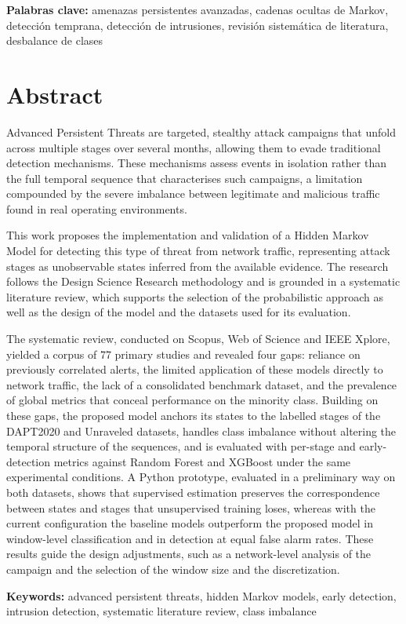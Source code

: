 {\bf Palabras clave:} amenazas persistentes avanzadas, cadenas ocultas de Markov, detección temprana, detección de intrusiones, revisión sistemática de literatura, desbalance de clases


\clearpage
\chapter*{Abstract}
Advanced Persistent Threats are targeted, stealthy attack campaigns that unfold across multiple stages over several months, allowing them to evade traditional detection mechanisms. These mechanisms assess events in isolation rather than the full temporal sequence that characterises such campaigns, a limitation compounded by the severe imbalance between legitimate and malicious traffic found in real operating environments.

This work proposes the implementation and validation of a Hidden Markov Model for detecting this type of threat from network traffic, representing attack stages as unobservable states inferred from the available evidence. The research follows the Design Science Research methodology and is grounded in a systematic literature review, which supports the selection of the probabilistic approach as well as the design of the model and the datasets used for its evaluation.

The systematic review, conducted on Scopus, Web of Science and IEEE Xplore, yielded a corpus of 77 primary studies and revealed four gaps: reliance on previously correlated alerts, the limited application of these models directly to network traffic, the lack of a consolidated benchmark dataset, and the prevalence of global metrics that conceal performance on the minority class. Building on these gaps, the proposed model anchors its states to the labelled stages of the DAPT2020 and Unraveled datasets, handles class imbalance without altering the temporal structure of the sequences, and is evaluated with per-stage and early-detection metrics against Random Forest and XGBoost under the same experimental conditions. A Python prototype, evaluated in a preliminary way on both datasets, shows that supervised estimation preserves the correspondence between states and stages that unsupervised training loses, whereas with the current configuration the baseline models outperform the proposed model in window-level classification and in detection at equal false alarm rates. These results guide the design adjustments, such as a network-level analysis of the campaign and the selection of the window size and the discretization.

{\bf Keywords:} advanced persistent threats, hidden Markov models, early detection, intrusion detection, systematic literature review, class imbalance
